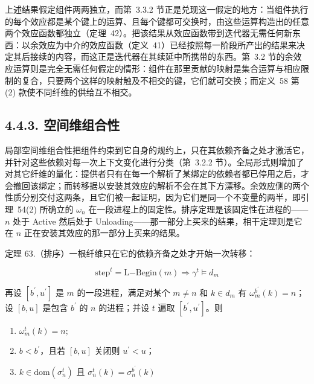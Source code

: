 上述结果假定组件两两独立，而第~3.3.2 节正是兑现这一假定的地方：当组件执行的每个效应都是某个键上的运算、且每个键都可交换时，由这些运算构造出的任意两个效应函数都独立（定理~42）。把该结果从效应函数带到迭代器无需任何新东西：以余效应为中介的效应函数（定义~41）已经按照每一阶段所产出的结果来决定其后接续的内容，而这正是迭代器在其续延中所携带的东西。第~3.2 节的余效应运算则是完全无需任何假定的情形：组件在那里贡献的映射是集合运算与相应限制的复合，只要两个这样的映射触及不相交的键，它们就可交换；而定义~58 第 (2) 款使不同纤维的供给互不相交。

\subsection{4.4.3. 空间维组合性}\label{spatial-composability}

局部空间维组合性把组件约束到它自身的规约上，只在其依赖齐备之处才激活它，并针对这些依赖对每一次上下文变化进行分类（第~3.2.2 节）。全局形式则增加了对其它纤维的量化：提供者只有在每一个解析了某绑定的依赖者都已停用之后，才会撤回该绑定；而转移据以安装其效应的解析不会在其下方漂移。余效应侧的两个性质分别交付这两条，且它们被一起证明，因为它们是同一个不变量的两半，即引理~54(2) 所确立的 \(\omega _ { n }\) 在一段进程上的固定性。排序定理是该固定性在进程的——\(n\) 处于 Active 然后处于 Unloading——那一部分上买来的结果，相干定理则是它在 \(n\) 正在安装其效应的那一部分上买来的结果。

定理 63.（排序）一根纤维只在它的依赖齐备之处才开始一次转移：

\[
{ \mathrm { s t e p } } ^ { t } = { \mathrm { L } } \mathrm { - B e g i n } ( m ) \Rightarrow \gamma ^ { t } \models d _ { m }\tag{58}
\]

再设 \([ b ^ { \prime } , u ^ { \prime } ]\) 是 \(m\) 的一段进程，满足对某个 \(m \neq n\) 和 \(k \in d _ { m }\) 有 \(\omega _ { m } ^ { b ^ { \prime } } ( k ) = n\)；设 \([ b , u ]\) 是包含 \(b ^ { \prime }\) 的 \(n\) 的进程；并设 \(t\) 遍取 \([ b ^ { \prime } , u ^ { \prime } ]\)。则

\begin{enumerate}
\def\labelenumi{\arabic{enumi}.}
\item
  \(\omega _ { m } ^ { t } ( k ) = n ;\)
\item
  \(b < b ^ { \prime }\)，且若 \([ b , u ]\) 关闭则 \(u ^ { \prime } < u\)；
\item
  \(k \in \mathrm { d o m } ( \sigma _ { n } ^ { t } )\) 且 \(\sigma _ { n } ^ { t } ( k ) = \sigma _ { n } ^ { b ^ { \prime } } ( k )\)
\end{enumerate}

